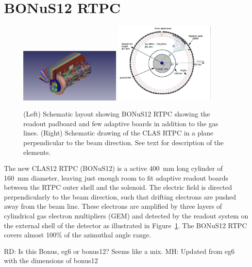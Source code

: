 \section{BONuS12 RTPC} 

\begin{figure}
  \begin{center}
    \includegraphics[angle=0, width=0.45\textwidth, clip,trim=50mm 10mm 80mm 
     0mm]{figures/Bonus12_cad.png}
    \includegraphics[angle=0, width=0.45\textwidth,clip,trim=0mm 10mm 20mm 0mm 
     ]{figures/NKsBXp.png}
     \caption{(Left) Schematic layout showing BONuS12 RTPC showing the readout 
     padboard and few adaptive boards in addition to the gas lines. (Right) 
     Schematic drawing of the CLAS RTPC in a plane perpendicular to the beam 
     direction. See text for description of the elements.}
    \label{fig:bonus12}
  \end{center}
\end{figure}

The new CLAS12 RTPC (BONuS12) is a active 400~mm long cylinder of 160~mm 
diameter, leaving just enough room to fit adaptive readout boards between the 
RTPC outer shell and the solenoid. The electric field is directed 
perpendicularly to the beam direction, such that drifting electrons are pushed 
away from the beam line. These electrons are amplified by three layers of 
cylindrical gas electron multipliers (GEM) and detected by the readout system 
on the external shell of the detector as illustrated in 
Figure~\ref{fig:bonus12}. The BONuS12 RTPC covers almost 100\% of the azimuthal 
angle range.

RD: Is this Bonus, eg6 or bonus12? Seems like a mix.
MH: Updated from eg6 with the dimensions of bonus12

